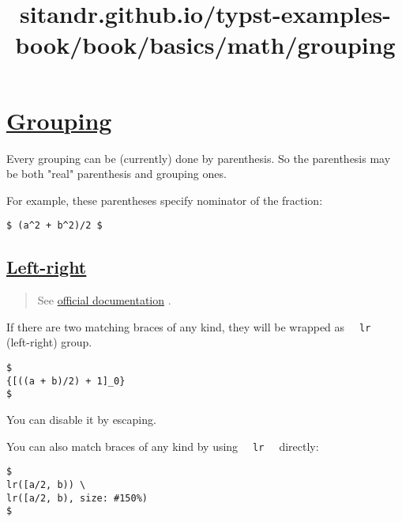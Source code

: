 \title{sitandr.github.io/typst-examples-book/book/basics/math/grouping}

\section{\texorpdfstring{\hyperref[grouping]{Grouping}}{Grouping}}\label{grouping}

Every grouping can be (currently) done by parenthesis. So the
parenthesis may be both "real" parenthesis and grouping ones.

For example, these parentheses specify nominator of the fraction:

\begin{verbatim}
$ (a^2 + b^2)/2 $
\end{verbatim}

\pandocbounded{}

\subsection{\texorpdfstring{\hyperref[left-right]{Left-right}}{Left-right}}\label{left-right}

\begin{quote}
See \href{https://typst.app/docs/reference/math/lr}{official
documentation} .
\end{quote}

If there are two matching braces of any kind, they will be wrapped as
\texttt{\ }{\texttt{\ lr\ }}\texttt{\ } (left-right) group.

\begin{verbatim}
$
{[((a + b)/2) + 1]_0}
$
\end{verbatim}

\pandocbounded{}

You can disable it by escaping.

You can also match braces of any kind by using
\texttt{\ }{\texttt{\ lr\ }}\texttt{\ } directly:

\begin{verbatim}
$
lr([a/2, b)) \
lr([a/2, b), size: #150%)
$
\end{verbatim}

\pandocbounded{}

